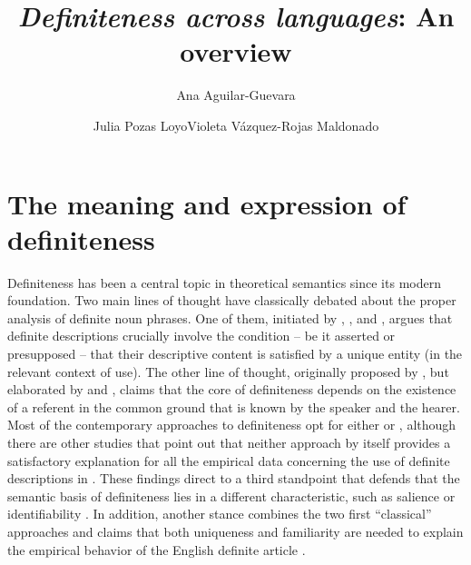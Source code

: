 \documentclass[output=paper]{langsci/langscibook}
\title{\texorpdfstring{\textit{Definiteness across languages}: An overview}{Definiteness across languages: An overview}}
\author{%
 Ana Aguilar-Guevara\affiliation{Universidad Nacional Autónoma de México}\and Julia {Pozas Loyo}\affiliation{El Colegio de México}\lastand Violeta {Vázquez-Rojas Maldonado}\affiliation{El Colegio de México}
}
\begin{document}
\abstract{~}
\maketitle

\section{The meaning and expression of definiteness}

Definiteness has been a central topic in theoretical semantics since its modern foundation. Two main lines of thought have classically debated about the proper analysis of definite noun phrases. One of them, initiated by \citet{Frege1892}, \citet{Russell1905}, and \citet{Strawson1950}, argues that definite descriptions crucially involve the condition -- be it asserted or presupposed -- that their descriptive content is satisfied by a unique entity (in the relevant context of use). The other line of thought, originally proposed by \citet{Christophersen1939}, but elaborated by \citet{Heim1982} and \citet{Kamp1981}, claims that the core of definiteness depends on the existence of a referent in the common ground that is known by the speaker and the hearer. Most of the contemporary approaches to definiteness opt for either  \citep[e.g.][]{Hawkins1978,Hawkins1991,Kadmon1990,Abbott1999} or  \citep[e.g.][]{Green1996,Chafe1996}, although there are other studies that point out that neither approach by itself provides a satisfactory explanation for all the empirical data concerning the use of definite descriptions in  \citep[e.g.][]{BirnerWard1994}. These findings direct to a third standpoint that defends that the semantic basis of definiteness lies in a different characteristic, such as salience \citep{Lewis1979} or identifiability \citep{BirnerWard1994}. In addition, another stance combines the two first “classical” approaches and claims that both uniqueness and familiarity are needed to explain the empirical behavior of the English definite article \citep{Farkas2002,Roberts2003}.
\end{document}
